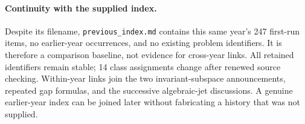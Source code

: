\paragraph{Continuity with the supplied index.}
Despite its filename, \texttt{previous\_index.md} contains this same year's
247 first-run items, no earlier-year occurrences, and no existing problem
identifiers.  It is therefore a comparison baseline, not evidence for
cross-year links.  All retained identifiers remain stable; 14 class
assignments change after renewed source checking.  Within-year links join
the two invariant-subspace announcements, repeated gap formulas, and the
successive algebraic-jet discussions.  A genuine earlier-year index can be
joined later without fabricating a history that was not supplied.
